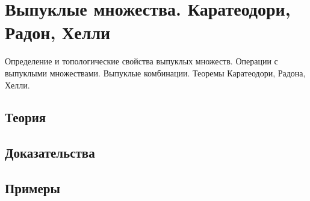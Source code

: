 
\section{Выпуклые множества. Каратеодори, Радон, Хелли}
\label{sec:2.4.01-convex-sets}

\begin{ticket}
Определение и топологические свойства выпуклых множеств. Операции с выпуклыми множествами. Выпуклые комбинации. Теоремы Каратеодори, Радона, Хелли.
\end{ticket}

\subsection*{Теория}

\subsection*{Доказательства}

\subsection*{Примеры}
